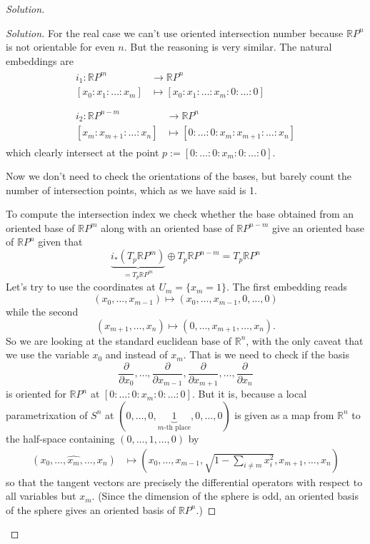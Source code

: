 \begin{proof}[Solution]
\begin{proof}[Solution]
For the real case we can't use oriented intersection number because \(\mathbb{R}P^{n}\) is not orientable for even \(n\). But the reasoning is very similar. The natural embeddings are
\begin{align*}
\begin{aligned}i_1: \mathbb{R}P^m &\longrightarrow \mathbb{R}P^n \\
	[x_0:x_1:\ldots:x_m] &\longmapsto [x_0:x_1:\ldots:x_m:0:\ldots:0]
\end{aligned}
\\\\\begin{aligned}	i_2: \mathbb{R}P^{n-m} &\longrightarrow \mathbb{R}P^n \\
[x_{m}:x_{m+1}:\ldots:x_n] &\longmapsto [0:\ldots:0:x_{m}:x_{m+1}:\ldots:x_n] \end{aligned}\end{align*}
which clearly intersect at the point \(p:=[0:\ldots:0:x_m:0:\ldots:0]\).

Now we don't need to check the orientations of the bases, but barely count the number of intersection points, which as we have said is 1.

\iffalse
To compute the intersection index we check whether the base obtained from an oriented base of \(\mathbb{R}P^{m}\) along with an oriented base of \(\mathbb{R}P^{n-m}\) give an oriented base of \(\mathbb{R}P^{n}\) given that
\[\underbrace{i_*(T_p \mathbb{R}P^{m})}_{=T_p\mathbb{R}P^m}\oplus T_p\mathbb{R}P^{n-m}=T_p\mathbb{R}P^{n}\]
Let's try to use the coordinates at \(U_m=\{x_m=1\}\). The first embedding reads
\[(x_0,\ldots,x_{m-1})\mapsto (x_0,\ldots,x_{m-1},0,\ldots,0)\]
while the second
\[(x_{m+1},\ldots,x_n)\mapsto (0,\ldots,x_{m+1},\ldots,x_n).\]
So we are looking at the standard euclidean base of \(\mathbb{R}^n\), with the only caveat that we use the variable \(x_0\) and instead of \(x_m\). That is we need to check if the basis
\[\frac{\partial }{\partial x_0},\ldots,\frac{\partial }{\partial x_{m-1}},\frac{\partial }{\partial x_{m+1}},\ldots,\frac{\partial }{\partial x_n}\]
is oriented for \(\mathbb{R}P^{n}\) at \([0:\ldots:0:x_m:0:\ldots:0]\). But it is, because a local parametrixation of \(S^{n}\) at \((0,\ldots,0,\underbrace{1}_{m\text{-th place} },0,\ldots,0)\) is given as a map from \(\mathbb{R}^n\) to the half-space containing \((0,\ldots,1,\ldots,0)\) by
\begin{align*}
	(x_0,\ldots,\widehat{x_m},\ldots,x_n) &\longmapsto \left(x_0,\ldots,x_{m-1},\sqrt{1-\sum_{i\neq m}x_i^2} ,x_{m+1},\ldots,x_n\right) 
\end{align*}
so that the tangent vectors are precisely the differential operators with respect to all variables but \(x_m\). (Since the dimension of the sphere is odd, an oriented basis of the sphere gives an oriented basis of  \(\mathbb{R}P^{n}\).)




\end{proof}
\end{proof}
